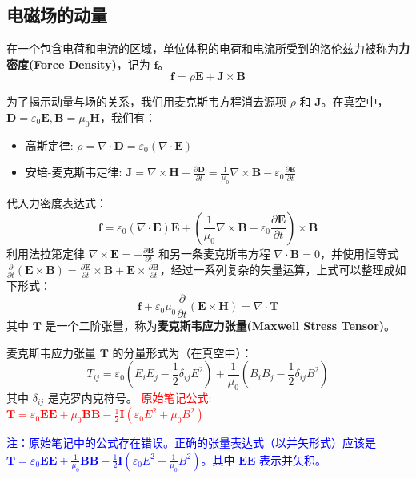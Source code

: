 \documentclass[fontset=none]{ctexart}
\begin{document}
\subsection{电磁场的动量}

\begin{definition}[电磁场力密度]
在一个包含电荷和电流的区域，单位体积的电荷和电流所受到的洛伦兹力被称为\textbf{力密度(Force Density)}，记为 $\bm{f}$。
\begin{equation}
    \bm{f} = \rho \bm{E} + \bm{J} \times \bm{B}
\end{equation}
\end{definition}

为了揭示动量与场的关系，我们用麦克斯韦方程消去源项 $\rho$ 和 $\bm{J}$。在真空中，$\bm{D}=\varepsilon_0 \bm{E}, \bm{B}=\mu_0 \bm{H}$，我们有：
\begin{itemize}
    \item 高斯定律: $\rho = \nabla \cdot \bm{D} = \varepsilon_0 (\nabla \cdot \bm{E})$
    \item 安培-麦克斯韦定律: $\bm{J} = \nabla \times \bm{H} - \frac{\partial \bm{D}}{\partial t} = \frac{1}{\mu_0}\nabla \times \bm{B} - \varepsilon_0 \frac{\partial \bm{E}}{\partial t}$
\end{itemize}
代入力密度表达式：
\begin{equation}
    \bm{f} = \varepsilon_0 (\nabla \cdot \bm{E})\bm{E} + \left(\frac{1}{\mu_0}\nabla \times \bm{B} - \varepsilon_0 \frac{\partial \bm{E}}{\partial t}\right) \times \bm{B}
\end{equation}
利用法拉第定律 $\nabla \times \bm{E} = -\frac{\partial \bm{B}}{\partial t}$ 和另一条麦克斯韦方程 $\nabla \cdot \bm{B} = 0$，并使用恒等式 $\frac{\partial}{\partial t}(\bm{E} \times \bm{B}) = \frac{\partial \bm{E}}{\partial t} \times \bm{B} + \bm{E} \times \frac{\partial \bm{B}}{\partial t}$，经过一系列复杂的矢量运算，上式可以整理成如下形式：
\begin{equation}
    \bm{f} + \varepsilon_0\mu_0\frac{\partial}{\partial t}(\bm{E} \times \bm{H}) = \nabla \cdot \mathbf{T}
\end{equation}
其中 $\mathbf{T}$ 是一个二阶张量，称为\textbf{麦克斯韦应力张量(Maxwell Stress Tensor)}。

\begin{definition}[麦克斯韦应力张量]
麦克斯韦应力张量 $\mathbf{T}$ 的分量形式为（在真空中）：
\begin{equation}
    T_{ij} = \varepsilon_0 \left(E_i E_j - \frac{1}{2}\delta_{ij}E^2\right) + \frac{1}{\mu_0}\left(B_i B_j - \frac{1}{2}\delta_{ij}B^2\right)
\end{equation}
其中 $\delta_{ij}$ 是克罗内克符号。
\textcolor{red}{原始笔记公式: $\mathbf{T} = \varepsilon_0 \bm{E}\bm{E} + \mu_0 \bm{B}\bm{B} - \frac{1}{2}\mathbf{I}(\varepsilon_0 E^2 + \mu_0 B^2)$}

\textcolor{blue}{注：原始笔记中的公式存在错误。正确的张量表达式（以并矢形式）应该是 $\mathbf{T} = \varepsilon_0 \bm{E}\bm{E} + \frac{1}{\mu_0}\bm{B}\bm{B} - \frac{1}{2}\mathbf{I}(\varepsilon_0 E^2 + \frac{1}{\mu_0}B^2)$。其中 $\bm{E}\bm{E}$ 表示并矢积。}
\end{definition}
\end{document}
